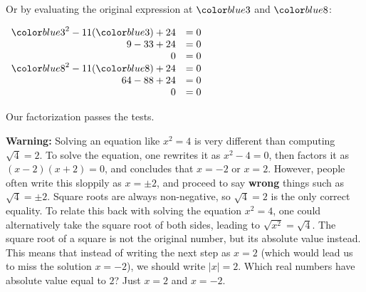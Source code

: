 \documentclass{ximera}
\begin{document}
 Or by evaluating the original expression at $\substitute{3}$ and $\substitute{8}$:
\begin{center}
$\begin{array}{rl}
    \substitute{3}^2-11(\substitute{3})+24 & = 0 \\
            9-33+24 & = 0 \\
            0 & = 0 \\
\substitute{8}^2-11(\substitute{8})+24 &=0\\
64-88+24 & =0\\
 0 & =0
\end{array}$
\end{center}
Our factorization passes the tests.

\begin{callout}
{\bf Warning:} Solving an equation like $x^2 = 4$ is very different than computing $\sqrt{4} = 2$. To solve the equation, one rewrites it as $x^2-4=0$, then factors it as $(x-2)(x+2) = 0$, and concludes that $x=-2$ or $x=2$. However, people often write this sloppily as $x = \pm 2$, and proceed to say {\bf wrong} things such as $\sqrt{4} = \pm 2$. Square roots are always non-negative, so $\sqrt{4}=2$ is the only correct equality. To relate this back with solving the equation $x^2=4$, one could alternatively take the square root of both sides, leading to $\sqrt{x^2} = \sqrt{4}$. The square root of a square is not the original number, but its absolute value instead. This means that instead of writing the next step as $x=2$ (which would lead us to miss the solution $x=-2$), we should write $|x| = 2$. Which real numbers have absolute value equal to $2$? Just $x=2$ and $x=-2$.
\end{callout}






\end{document}
